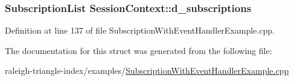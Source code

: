 \subsubsection[{\texorpdfstring{d\+\_\+subscriptions}{d_subscriptions}}]{\setlength{\rightskip}{0pt plus 5cm}Subscription\+List Session\+Context\+::d\+\_\+subscriptions}\hypertarget{struct_session_context_a402f225bad076712bc6b29b04b7deb09}{}\label{struct_session_context_a402f225bad076712bc6b29b04b7deb09}


Definition at line 137 of file Subscription\+With\+Event\+Handler\+Example.\+cpp.



The documentation for this struct was generated from the following file\+:\begin{DoxyCompactItemize}
\item 
raleigh-\/triangle-\/index/examples/\hyperlink{_subscription_with_event_handler_example_8cpp}{Subscription\+With\+Event\+Handler\+Example.\+cpp}\end{DoxyCompactItemize}
